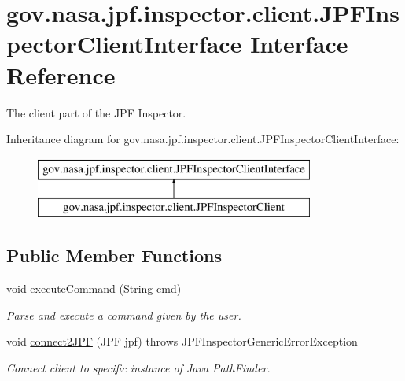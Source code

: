 \hypertarget{interfacegov_1_1nasa_1_1jpf_1_1inspector_1_1client_1_1_j_p_f_inspector_client_interface}{}\section{gov.\+nasa.\+jpf.\+inspector.\+client.\+J\+P\+F\+Inspector\+Client\+Interface Interface Reference}
\label{interfacegov_1_1nasa_1_1jpf_1_1inspector_1_1client_1_1_j_p_f_inspector_client_interface}


The client part of the J\+PF Inspector.  


Inheritance diagram for gov.\+nasa.\+jpf.\+inspector.\+client.\+J\+P\+F\+Inspector\+Client\+Interface\+:\begin{figure}[H]
\begin{center}
\leavevmode
\includegraphics[height=2.000000cm]{interfacegov_1_1nasa_1_1jpf_1_1inspector_1_1client_1_1_j_p_f_inspector_client_interface}
\end{center}
\end{figure}
\subsection*{Public Member Functions}
\begin{DoxyCompactItemize}
\item 
void \hyperlink{interfacegov_1_1nasa_1_1jpf_1_1inspector_1_1client_1_1_j_p_f_inspector_client_interface_a311b9271afa61a535f0dbccd80fdf4f5}{execute\+Command} (String cmd)
\begin{DoxyCompactList}\small\item\em Parse and execute a command given by the user. \end{DoxyCompactList}\item 
void \hyperlink{interfacegov_1_1nasa_1_1jpf_1_1inspector_1_1client_1_1_j_p_f_inspector_client_interface_a687ef63d8a21d78f5d0e7b265e9863ea}{connect2\+J\+PF} (J\+PF jpf)  throws J\+P\+F\+Inspector\+Generic\+Error\+Exception
\begin{DoxyCompactList}\small\item\em Connect client to specific instance of Java Path\+Finder. \end{DoxyCompactList}\end{DoxyCompactItemize}


